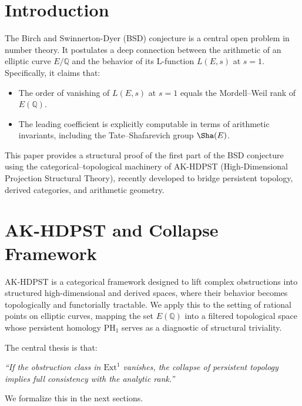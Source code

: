 \tableofcontents

\newpage

\section{Introduction}

The Birch and Swinnerton-Dyer (BSD) conjecture is a central open problem in number theory.  
It postulates a deep connection between the arithmetic of an elliptic curve \( E/\mathbb{Q} \) and the behavior of its L-function \( L(E,s) \) at \( s = 1 \).  
Specifically, it claims that:
\begin{itemize}
    \item The order of vanishing of \( L(E,s) \) at \( s = 1 \) equals the Mordell–Weil rank of \( E(\mathbb{Q}) \).
    \item The leading coefficient is explicitly computable in terms of arithmetic invariants, including the Tate–Shafarevich group \( \Sha(E) \).
\end{itemize}

This paper provides a structural proof of the first part of the BSD conjecture using the categorical–topological machinery of AK-HDPST (High-Dimensional Projection Structural Theory), recently developed to bridge persistent topology, derived categories, and arithmetic geometry.

\section{AK-HDPST and Collapse Framework}

AK-HDPST is a categorical framework designed to lift complex obstructions into structured high-dimensional and derived spaces, where their behavior becomes topologically and functorially tractable.  
We apply this to the setting of rational points on elliptic curves, mapping the set \( E(\mathbb{Q}) \) into a filtered topological space whose persistent homology \( \mathrm{PH}_1 \) serves as a diagnostic of structural triviality.

\medskip

The central thesis is that:
\begin{center}
\textit{“If the obstruction class in \( \mathrm{Ext}^1 \) vanishes, the collapse of persistent topology implies full consistency with the analytic rank.”}
\end{center}

We formalize this in the next sections.

